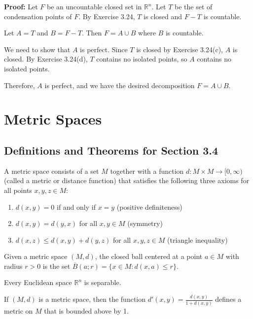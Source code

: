 \textbf{Proof:} Let $F$ be an uncountable closed set in $\mathbb{R}^n$. Let $T$ be the set of condensation points of $F$. By Exercise 3.24, $T$ is closed and $F - T$ is countable.

Let $A = T$ and $B = F - T$. Then $F = A \cup B$ where $B$ is countable.

We need to show that $A$ is perfect. Since $T$ is closed by Exercise 3.24(c), $A$ is closed. By Exercise 3.24(d), $T$ contains no isolated points, so $A$ contains no isolated points.

Therefore, $A$ is perfect, and we have the desired decomposition $F = A \cup B$.

\section{Metric Spaces}

\subsection*{Definitions and Theorems for Section 3.4}

\begin{definition}
A metric space consists of a set $M$ together with a function $d: M \times M \to [0,\infty)$ (called a metric or distance function) that satisfies the following three axioms for all points $x, y, z \in M$:
\begin{enumerate}
\item $d(x,y) = 0$ if and only if $x = y$ (positive definiteness)
\item $d(x,y) = d(y,x)$ for all $x,y \in M$ (symmetry)
\item $d(x,z) \leq d(x,y) + d(y,z)$ for all $x,y,z \in M$ (triangle inequality)
\end{enumerate}
\end{definition}

\begin{definition}
Given a metric space $(M,d)$, the closed ball centered at a point $a \in M$ with radius $r > 0$ is the set $\overline{B}(a;r) = \{x \in M : d(x,a) \leq r\}$.
\end{definition}

\begin{theorem}
Every Euclidean space $\mathbb{R}^n$ is separable.
\end{theorem}

\begin{theorem}
If $(M,d)$ is a metric space, then the function $d'(x,y) = \frac{d(x,y)}{1 + d(x,y)}$ defines a metric on $M$ that is bounded above by 1.
\end{theorem}

